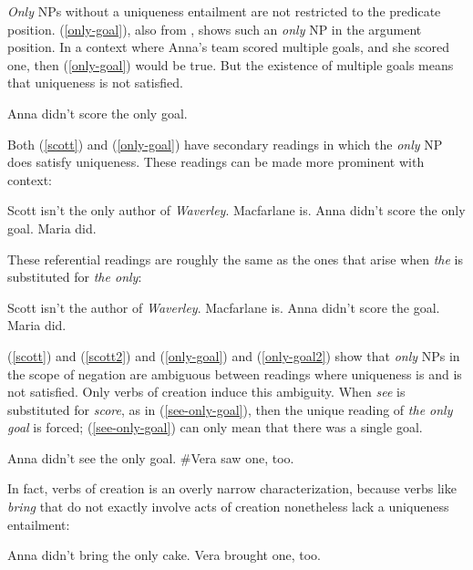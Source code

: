 \textit{Only} NPs without a uniqueness entailment are not restricted to the predicate position. (\ref{only-goal}), also from \citet{cb2015}, shows such an \textit{only} NP in the argument position. In a context where Anna's team scored multiple goals, and she scored one, then (\ref{only-goal}) would be true. But the existence of multiple goals means that uniqueness is not satisfied.

\begin{exe}
	\ex \label{only-goal} Anna didn't score the only goal.
\end{exe}

Both (\ref{scott}) and (\ref{only-goal}) have secondary readings in which the \textit{only} NP does satisfy uniqueness. These readings can be made more prominent with context:

\begin{exe}
	\ex \label{scott2} Scott isn't the only author of \textit{Waverley}. Macfarlane is.
	\ex \label{only-goal2} Anna didn't score the only goal. Maria did.
\end{exe}

These referential readings are roughly the same as the ones that arise when \textit{the} is substituted for \textit{the only}:

\begin{exe}
	\ex Scott isn't the author of \textit{Waverley}. Macfarlane is.
	\ex Anna didn't score the goal. Maria did.
\end{exe}

(\ref{scott}) and (\ref{scott2}) and (\ref{only-goal}) and (\ref{only-goal2}) show that \textit{only} NPs in the scope of negation are ambiguous between readings where uniqueness is and is not satisfied. Only verbs of creation induce this ambiguity. When \textit{see} is substituted for \textit{score}, as in (\ref{see-only-goal}), then the unique reading of \textit{the only goal} is forced; (\ref{see-only-goal}) can only mean that there was a single goal.

\begin{exe}
	\ex \label{see-only-goal} Anna didn't see the only goal. \#Vera saw one, too.
\end{exe}

In fact, verbs of creation is an overly narrow characterization, because verbs like \textit{bring} that do not exactly involve acts of creation nonetheless lack a uniqueness entailment:

\begin{exe}
	\ex Anna didn't bring the only cake. Vera brought one, too.
\end{exe}

